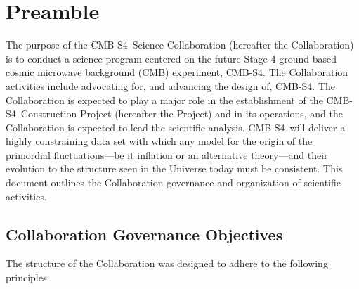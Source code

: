 \documentclass[12pt]{article}
\newcommand\collabname{CMB-S4}
\begin{document}
\section{Preamble}

The purpose of the \collabname\ Science Collaboration (hereafter the Collaboration) is to conduct a science program centered on the future Stage-4 ground-based cosmic microwave background (CMB) experiment, \collabname. The Collaboration activities include advocating for, and advancing the design of, \collabname. The Collaboration is expected to play a major role in the establishment of the \collabname\ Construction Project (hereafter the Project) and in its operations, and the Collaboration is expected to lead the scientific analysis. 
\collabname\ will deliver a highly constraining data set with which any model for the origin of the primordial fluctuations---be it inflation or an alternative theory---and their evolution to the structure seen in the Universe today must be consistent. 
This document outlines the Collaboration governance and organization of scientific activities.

\subsection{Collaboration Governance Objectives}
 The structure of the Collaboration was designed to adhere to the following principles:
\end{document}
